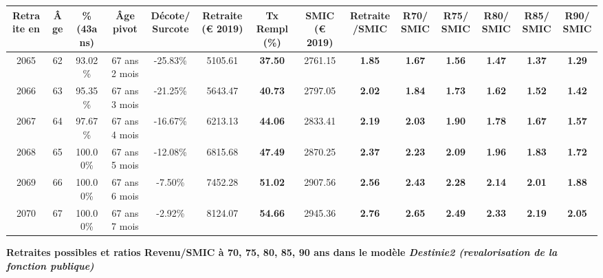 \begin{adjustbox}{max width=\textwidth} 
\begin{tabular}[htb]{|c|c||c|c|c||c|c||c|c||c|c|c|c|c|} 
\hline 
 Retraite en &  Âge &  \%(43ans) &  Âge pivot &  Décote/Surcote &  Retraite (\euro{} 2019) &  Tx Rempl(\%) &  SMIC (\euro{} 2019) &  Retraite/SMIC &  R70/SMIC &  R75/SMIC &  R80/SMIC &  R85/SMIC &  R90/SMIC \\ 
\hline \hline 
 2065 &  62 &  93.02\% &  67 ans 2 mois &  -25.83\% &  5105.61 &  {\bf 37.50} &  2761.15 &  {\bf 1.85} &  {\bf 1.67} &  {\bf 1.56} &  {\bf 1.47} &  {\bf 1.37} &  {\bf 1.29} \\ 
\hline 
 2066 &  63 &  95.35\% &  67 ans 3 mois &  -21.25\% &  5643.47 &  {\bf 40.73} &  2797.05 &  {\bf 2.02} &  {\bf 1.84} &  {\bf 1.73} &  {\bf 1.62} &  {\bf 1.52} &  {\bf 1.42} \\ 
\hline 
 2067 &  64 &  97.67\% &  67 ans 4 mois &  -16.67\% &  6213.13 &  {\bf 44.06} &  2833.41 &  {\bf 2.19} &  {\bf 2.03} &  {\bf 1.90} &  {\bf 1.78} &  {\bf 1.67} &  {\bf 1.57} \\ 
\hline 
 2068 &  65 &  100.00\% &  67 ans 5 mois &  -12.08\% &  6815.68 &  {\bf 47.49} &  2870.25 &  {\bf 2.37} &  {\bf 2.23} &  {\bf 2.09} &  {\bf 1.96} &  {\bf 1.83} &  {\bf 1.72} \\ 
\hline 
 2069 &  66 &  100.00\% &  67 ans 6 mois &  -7.50\% &  7452.28 &  {\bf 51.02} &  2907.56 &  {\bf 2.56} &  {\bf 2.43} &  {\bf 2.28} &  {\bf 2.14} &  {\bf 2.01} &  {\bf 1.88} \\ 
\hline 
 2070 &  67 &  100.00\% &  67 ans 7 mois &  -2.92\% &  8124.07 &  {\bf 54.66} &  2945.36 &  {\bf 2.76} &  {\bf 2.65} &  {\bf 2.49} &  {\bf 2.33} &  {\bf 2.19} &  {\bf 2.05} \\ 
\hline 
\hline 
\end{tabular} 
\end{adjustbox} 
 
 \vspace{0.1cm} 
{\bf \noindent Retraites possibles et ratios Revenu/SMIC à 70, 75, 80, 85, 90 ans dans le modèle \emph{Destinie2 (revalorisation de la fonction publique)}}  
 
